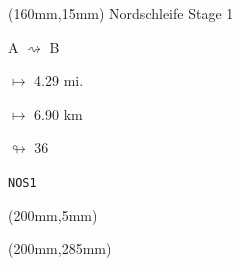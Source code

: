 \begin{textblock*}{40mm}(160mm,15mm)%
Nordschleife Stage 1
\par A $\rightsquigarrow$ B
\Large
\par$\mapsto$ 4.29 mi.
\par$\mapsto$ 6.90 km
\par$\looparrowright$ 36
\par\hfill\tiny\tt NOS1\\
\end{textblock*}
\begin{textblock*}{20mm}(200mm,5mm)%
\fbox{\thepage}
\end{textblock*}
\begin{textblock*}{20mm}(200mm,285mm)%
\fbox{\thepage}
\end{textblock*}
\null\newpage

